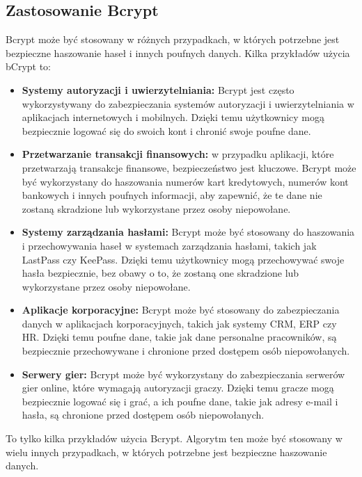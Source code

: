 \documentclass[12pt, a4paper]{article}
\begin{document}
\subsection{Zastosowanie Bcrypt}

Bcrypt może być stosowany w różnych przypadkach, w których potrzebne jest bezpieczne haszowanie haseł i innych poufnych danych. 
Kilka przykładów użycia bCrypt to:
\begin{itemize}
\item \textbf{Systemy autoryzacji i uwierzytelniania:} Bcrypt jest często wykorzystywany do zabezpieczania systemów autoryzacji i uwierzytelniania w aplikacjach internetowych i mobilnych. Dzięki temu użytkownicy mogą bezpiecznie logować się do swoich kont i chronić swoje poufne dane.
\item \textbf{Przetwarzanie transakcji finansowych:} w przypadku aplikacji, które przetwarzają transakcje finansowe, bezpieczeństwo jest kluczowe. Bcrypt może być wykorzystany do haszowania numerów kart kredytowych, numerów kont bankowych i innych poufnych informacji, aby zapewnić, że te dane nie zostaną skradzione lub wykorzystane przez osoby niepowołane.
\item \textbf{Systemy zarządzania hasłami:} Bcrypt może być stosowany do haszowania i przechowywania haseł w systemach zarządzania hasłami, takich jak LastPass czy KeePass. Dzięki temu użytkownicy mogą przechowywać swoje hasła bezpiecznie, bez obawy o to, że zostaną one skradzione lub wykorzystane przez osoby niepowołane.
\item \textbf{Aplikacje korporacyjne:} Bcrypt może być stosowany do zabezpieczania danych w aplikacjach korporacyjnych, takich jak systemy CRM, ERP czy HR. Dzięki temu poufne dane, takie jak dane personalne pracowników, są bezpiecznie przechowywane i chronione przed dostępem osób niepowołanych.
\item \textbf{Serwery gier:} Bcrypt może być wykorzystany do zabezpieczania serwerów gier online, które wymagają autoryzacji graczy. Dzięki temu gracze mogą bezpiecznie logować się i grać, a ich poufne dane, takie jak adresy e-mail i hasła, są chronione przed dostępem osób niepowołanych.
\end{itemize}
To tylko kilka przykładów użycia Bcrypt. Algorytm ten może być stosowany w wielu innych przypadkach, w których potrzebne jest bezpieczne haszowanie danych.
\end{document}
